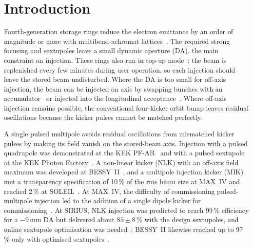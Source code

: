 \documentclass[aps,prab,reprint,amsmath,amssymb,floatfix,longbibliography]{revtex4-2}
\begin{document}
\section{Introduction}
\label{sec:intro}

Fourth-generation storage rings reduce the electron emittance by an order of magnitude or more with multibend-achromat lattices~\cite{Hettel2014,Raimondi2021}. The required strong focusing and sextupoles leave a small dynamic aperture (DA), the main constraint on injection. These rings also run in top-up mode~\cite{Emery1999}: the beam is replenished every few minutes during user operation, so each injection should leave the stored beam undisturbed. Where the DA is too small for off-axis injection, the beam can be injected on axis by swapping bunches with an accumulator~\cite{Emery2003} or injected into the longitudinal acceptance~\cite{Aiba2015}. Where off-axis injection remains possible, the conventional four-kicker orbit bump leaves residual oscillations because the kicker pulses cannot be matched perfectly.

A single pulsed multipole avoids residual oscillations from mismatched kicker pulses by making its field vanish on the stored-beam axis. Injection with a pulsed quadrupole was demonstrated at the KEK PF-AR~\cite{Harada2007} and with a pulsed sextupole at the KEK Photon Factory~\cite{Takaki2010}. A non-linear kicker (NLK) with an off-axis field maximum was developed at BESSY~II~\cite{Atkinson2011,Gora2023}, and a multipole injection kicker (MIK) met a transparency specification of 10\,\% of the rms beam size at MAX~IV and reached 2\,\% at SOLEIL~\cite{Alexandre2021,Kallestrup2019,Ollier2023}. At MAX~IV, the difficulty of commissioning pulsed-multipole injection led to the addition of a single dipole kicker for commissioning~\cite{Leemann2012}. At SIRIUS, NLK injection was predicted to reach 99\,\% efficiency for a $-9$\,mm DA but delivered about $85\pm8$\,\% with the design sextupoles, and online sextupole optimisation was needed~\cite{Liu2016,Velloso2023}; BESSY~II likewise reached up to 97\,\% only with optimised sextupoles~\cite{Gora2023}.
\end{document}
